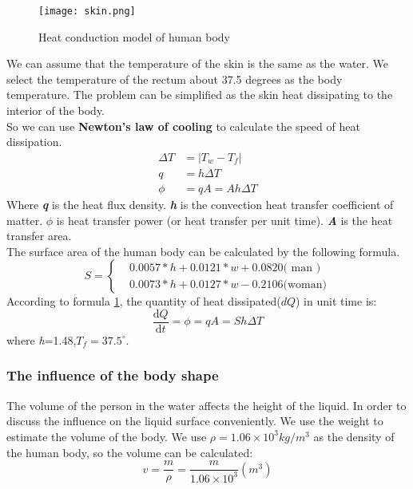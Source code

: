 \documentclass{mcmthesis}
\begin{document}
\begin{figure}[H]
\centerline{\texttt{[image: skin.png]}}
\caption{Heat conduction model of human body}
\label{skin}
\end{figure}
\indent We can assume that the temperature of the skin is the same as the water. We select the temperature of the rectum about 37.5 degrees as the body temperature. The problem can be simplified as the skin heat dissipating to the interior of the body.\\
\indent So we can use {\bf Newton's law of cooling} to calculate the speed of heat dissipation.\\
\begin{equation}
\begin{split}
\Delta T&=|T_{w}-T_{f}| \\
q&=h\Delta T	\\
\phi &=qA=Ah\Delta T
\end{split}
\end{equation}
\indent Where \textbf{\emph{q}} is the heat flux density. \textbf{\emph{h}} is the convection heat transfer coefficient of matter. \textbf{\emph{$\phi$}}  is heat transfer power (or heat transfer per unit time). \textbf{\emph{A}} is the heat transfer area.\\
\indent The surface area of the human body can be calculated by the following formula.
\begin{equation}
S= \begin{cases} & 0.0057*h+0.0121*w+0.0820\text{( man )} \\ & 0.0073*h+0.0127*w-0.2106\text{(woman)} \end{cases}
\label{s}
\end{equation}
\indent According to formula \ref{skin}, the quantity of heat dissipated($dQ$) in unit time is:
\begin{equation}
	\frac{\mathrm{d} Q}{\mathrm{d} t}=\phi =qA=Sh\Delta T
	\label{Q_skin}
\end{equation}
where \emph{h}=1.48,${T_{f}}=37.5^{\circ}$. \\
\subsubsection{The influence of the body shape}
The volume of the person in the water affects the height of the liquid. In order to discuss the influence on the liquid surface conveniently. We use the weight to estimate the volume of the body. We use $\rho =1.06\times10^{3}kg/m^{3}$ as the density of the human body, so the volume can be calculated:
\begin{equation}
v=\frac{m}{\rho }=\frac{m}{1.06\times 10^{3}}(m^{3})
\end{equation}
\end{document}
